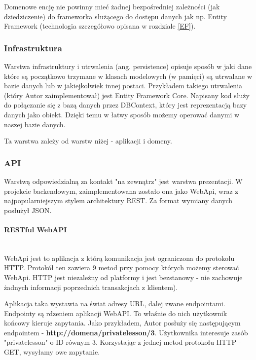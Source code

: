 \documentclass[12pt]{article}
\newcommand{\myparagraph}[1]{\paragraph{#1}\mbox{}\\}
\numberwithin{figure}{section}
\begin{document}
\begin{sloppypar}
    Domenowe encję nie powinny mieć żadnej bezpośredniej zależności (jak dziedziczenie) do frameworka służącego do dostępu danych jak np. Entity Framework (technologia szczegółowo opisana w rozdziale \ref{EF}).
        
    \subsubsection{Infrastruktura}
    Warstwa infrastruktury i utrwalenia (ang. persistence) opisuje sposób w jaki dane które są początkowo trzymane w klasach modelowych (w pamięci) są utrwalane w bazie danych lub w jakiejkolwiek innej postaci. Przykładem takiego utrwalenia (który Autor zaimplementował) jest Entity Framework Core. Napisany kod służy do połączanie się z bazą danych przez DBContext, który jest reprezentacją bazy danych jako obiekt. Dzięki temu w łatwy sposób możemy operować danymi w naszej bazie danych.
        
    Ta warstwa zależy od warstw niżej - aplikacji i domeny.
        
    \subsubsection{API}
    Warstwą odpowiedzialną za kontakt "na zewnątrz" jest warstwa prezentacji. W projekcie backendowym, zaimplementowana zostało ona jako WebApi, wraz z najpopularniejszym stylem architektury REST. Za format wymiany danych posłużył JSON.
        
        \myparagraph{RESTful WebAPI}
        WebApi jest to aplikacja z którą komunikacja jest ograniczona do protokołu HTTP. Protokół ten zawiera 9 metod przy pomocy których możemy sterować WebApi. 
        HTTP jest niezależny od platformy i jest bezstanowy - nie zachowuje żadnych informacji poprzednich transakcjach z klientem). 
        
        Aplikacja taka wystawia na świat adresy URL, dalej zwane endpointami.
        Endpointy są rdzeniem aplikacji WebAPI. To właśnie do nich użytkownik końcowy kieruje zapytania. Jako przykładem, Autor posłuży się następującym endpointem - \textbf{http://domena/privatelesson/3}. Użytkownika interesuje zasób "privatelesson" o ID równym 3. Korzystając z jednej metod protokołu HTTP - GET, wysyłamy owe zapytanie.
        

\end{sloppypar}
\end{document}
